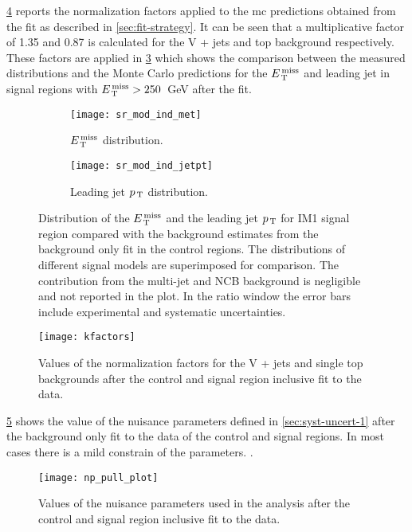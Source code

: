 \cref{fig:kfactors} reports the normalization factors applied to the \gls{mc}
predictions obtained from the fit as described in \cref{sec:fit-strategy}. It
can be seen that a multiplicative factor of 1.35 and 0.87 is calculated for the
V + jets and top background respectively. These factors are applied in
\cref{fig:sr_plots} which shows the comparison between the measured
distributions and the Monte Carlo predictions for the $E_\mathrm{\, T}^\mathrm{\, miss}$ and leading jet in
signal regions with $E_\mathrm{\, T}^\mathrm{\, miss} > 250$~GeV after the fit.
\begin{figure}[!h]
  \centering
  \begin{subfigure}[t]{.48\linewidth}
    \texttt{[image: sr\_mod\_ind\_met]}
    \caption{$E_\mathrm{\, T}^\mathrm{\, miss}$ distribution.}
    \label{fig:sr_et_miss}
  \end{subfigure}
  \begin{subfigure}[t]{.48\linewidth}
    \texttt{[image: sr\_mod\_ind\_jetpt]}
    \caption{Leading jet $p_\mathrm{\, T}$ distribution.}
    \label{fig:sr_jet1_pt}
  \end{subfigure}
  \caption{Distribution of the $E_\mathrm{\, T}^\mathrm{\, miss}$ and the leading jet $p_\mathrm{\, T}$ for IM1 signal
    region compared with the background estimates from the background only fit
    in the control regions. The distributions of different signal models are
    superimposed for comparison. The contribution from the multi-jet and NCB
    background is negligible and not reported in the plot. In the ratio window
    the error bars include experimental and systematic uncertainties.}
  \label{fig:sr_plots}
\end{figure}
\begin{figure}[!h]
  \centering
  \texttt{[image: kfactors]}
  \caption{Values of the normalization factors for the V + jets and single top
    backgrounds after the control and signal region inclusive fit to the data.}
  \label{fig:kfactors}
\end{figure}
\cref{fig:np_pull} shows the value of the nuisance parameters defined in
\cref{sec:syst-uncert-1} after the background only fit to the data of the
control and signal regions. In most cases there is a mild constrain of the
parameters. .
\begin{figure}[!h]
  \centering
  \texttt{[image: np\_pull\_plot]}
  \caption{Values of the nuisance parameters used in the analysis after the
    control and signal region inclusive fit to the data.}
  \label{fig:np_pull}
\end{figure}
